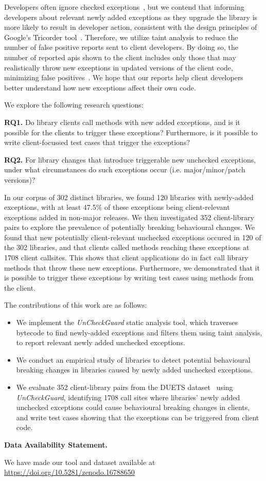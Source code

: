 Developers often ignore checked exceptions~\cite{nakshatri16:_analy_java}, but we
contend that informing developers about relevant newly added exceptions as they upgrade
the library is more likely to result in developer action, consistent with the design principles
of Google’s Tricorder tool~\cite{sadowski15:_tricor}. Therefore, we utilize taint
analysis to reduce the number of false positive reports sent to client developers.
By doing so, the number of reported \gls{api}s shown to the client includes only
those that may realistically throw new exceptions in updated versions of the client
code, minimizing false positives~\cite{pashchenko20:_vuln4}.
We hope that our reports help client developers better understand how new exceptions
affect their own code.

We explore the following research questions:

\noindent
{\bf RQ1.} Do library clients call methods with new added exceptions, and is it possible for the clients to trigger these exceptions? Furthermore, is it possible to write client-focussed test cases that trigger the exceptions?

\noindent
{\bf RQ2.} For library changes that introduce triggerable new unchecked exceptions, under what circumstances do such exceptions occur (i.e. major/minor/patch versions)?

In our corpus of 302 distinct libraries, we found 120 libraries with newly-added exceptions, with at least 47.5\% of these exceptions being client-relevant exceptions added in non-major releases.
We then investigated 352 client-library pairs to explore the prevalence of potentially breaking behavioural changes.
We found that new potentially client-relevant unchecked exceptions occured in 120 of the 302 libraries, and that clients called methods reaching these exceptions at 1708 client callsites.
This shows that client applications do in fact call library methods that throw these new exceptions.
Furthermore, we demonstrated that it is possible to trigger these exceptions by writing test cases using methods from the client.

The contributions of this work are as follows:

\begin{itemize}
    \item We implement the \textit{UnCheckGuard} static analysis tool, which traverses bytecode to find newly-added exceptions and filters them using taint analysis, to report relevant newly added unchecked exceptions.
    \item We conduct an empirical study of libraries to detect potential behavioural breaking changes in libraries caused by newly added unchecked exceptions.
    \item We evaluate 352 client-library pairs from the DUETS dataset~\cite{durieux21:_duets} using \textit{UnCheckGuard}, identifying 1708 call sites where libraries' newly added unchecked exceptions could cause behavioural breaking changes in clients, and write test cases showing that the exceptions can be triggered from client code.
\end{itemize}

\noindent \textbf{Data Availability Statement.}

\indent We have made our tool and dataset available at \url{https://doi.org/10.5281/zenodo.16788650}